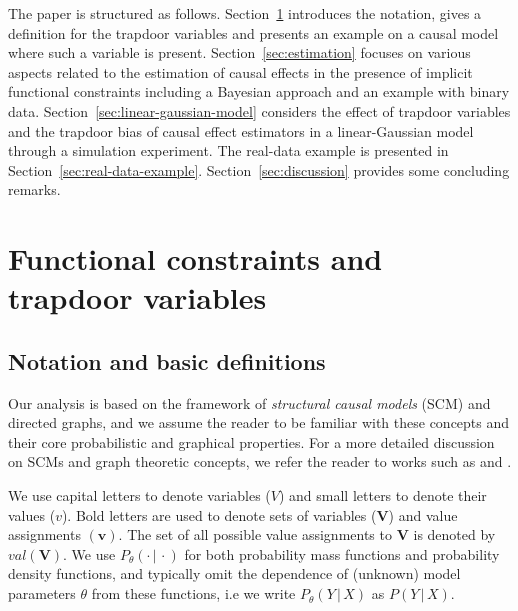 \documentclass{statsoc}
\newcommand{\+}[1]{\ensuremath{\mathbf{#1}}}
\newcommand{\given}{{ \, | \, }}
\begin{document}
The paper is structured as follows. Section~\ref{sec:theory} introduces the notation, gives a definition for the trapdoor variables and presents an example on a causal model where such a variable is present. Section~\ref{sec:estimation} focuses on various aspects related to the estimation of causal effects in the presence of implicit functional constraints including a Bayesian approach and an example with binary data. Section~\ref{sec:linear-gaussian-model} considers the effect of trapdoor variables and the trapdoor bias of causal effect estimators in a linear-Gaussian model through a simulation experiment. The real-data example is presented in Section~\ref{sec:real-data-example}. Section~\ref{sec:discussion} provides some concluding remarks.

\section{Functional constraints and trapdoor variables}
\label{sec:theory}

\subsection{Notation and basic definitions}
Our analysis is based on the framework of \emph{structural causal models} (SCM) and directed graphs, and we assume the reader to be familiar with these concepts and their core probabilistic and graphical properties. For a more detailed discussion on SCMs and graph theoretic concepts, we refer the reader to works such as \citep{Pearl:book2009} and \citep{Koller09}. 

We use capital letters to denote variables ($V$) and small letters to denote their values ($v$). Bold letters are used to denote sets of variables ($\+V$) and value assignments $(\+ v)$. The set of all possible value assignments to $\+ V$ is denoted by $val(\+ V)$. We use $P_{\theta}(\cdot \given \cdot)$ for both probability mass functions and probability density functions, and typically omit the dependence of (unknown) model parameters $\theta$ from these functions, i.e we write $P_\theta(Y \given X)$ as $P(Y \given X)$.
\end{document}
